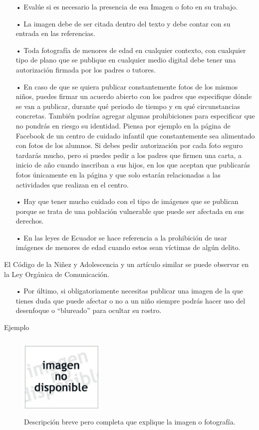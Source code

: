 \documentclass[12pt, a4paper, nofontenc, numbers=endperiod]{apa7}
\begin{document}
{\begin{itemize}[leftmargin=0.5cm]
	\item[•] Evalúe si es necesario la presencia de esa Imagen o foto en su trabajo.
	\item[•] La imagen debe de ser citada dentro del texto y debe contar con su entrada en las referencias.
	\item[•] Toda fotografía de menores de edad en cualquier contexto, con cualquier tipo de plano que se publique en cualquier medio digital debe tener una autorización firmada por los padres o tutores.
	\item[•] En caso de que se quiera publicar constantemente fotos de los mismos niños, puedes firmar un acuerdo abierto con los padres que especifique dónde se van a publicar, durante qué periodo de tiempo y en qué circunstancias concretas. También podrías agregar algunas prohibiciones para especificar que no pondrás en riesgo su identidad. Piensa por ejemplo en la página de Facebook de un centro de cuidado infantil que constantemente sea alimentado con fotos de los alumnos. Si debes pedir autorización por cada foto seguro tardarás mucho, pero si puedes pedir a los padres que firmen una carta, a inicio de año cuando inscriban a sus hijos, en los que aceptan que publicarás fotos únicamente en la página y que solo estarán relacionadas a las actividades que realizan en el centro.
	\item[•] Hay que tener mucho cuidado con el tipo de imágenes que se publican porque se trata de una población vulnerable que puede ser afectada en sus derechos. 
	\item[•] En las leyes de Ecuador se hace referencia a la prohibición de usar imágenes de menores de edad cuando estos sean víctimas de algún delito.
\end{itemize}
El Código de la Niñez y Adolescencia y un artículo similar se puede observar en la Ley Orgánica de Comunicación.
\begin{itemize}[leftmargin=0.5cm]	
	\item[•] Por último, si obligatoriamente necesitas publicar una imagen de la que tienes duda que puede afectar o no a un niño siempre podrás hacer uso del desenfoque o “blureado” para ocultar su rostro.
\end{itemize}
Ejemplo
\vspace*{0.2cm}

\begin{figure}[h]
	\caption{Descripción breve pero completa que explique la imagen o fotografía.}
	\label{Figura5} %
	\vspace*{0.1cm}
	\begin{center}
		\centering \includegraphics[width=4cm,height=4cm]{Imagenes/Figura41}
	\end{center}
	

\end{figure}}
\end{document}
